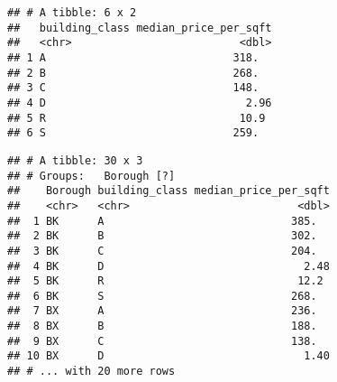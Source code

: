\documentclass[]{article}
\newenvironment{Shaded}{\begin{snugshade}}{\end{snugshade}}
\newcommand{\ControlFlowTok}[1]{\textcolor[rgb]{0.13,0.29,0.53}{\textbf{#1}}}
\newcommand{\DataTypeTok}[1]{\textcolor[rgb]{0.13,0.29,0.53}{#1}}
\newcommand{\KeywordTok}[1]{\textcolor[rgb]{0.13,0.29,0.53}{\textbf{#1}}}
\newcommand{\NormalTok}[1]{#1}
\newcommand{\OperatorTok}[1]{\textcolor[rgb]{0.81,0.36,0.00}{\textbf{#1}}}
\newcommand{\StringTok}[1]{\textcolor[rgb]{0.31,0.60,0.02}{#1}}
\begin{document}
\begin{Shaded}
\end{Shaded}

\begin{verbatim}
## # A tibble: 6 x 2
##   building_class median_price_per_sqft
##   <chr>                          <dbl>
## 1 A                             318.  
## 2 B                             268.  
## 3 C                             148.  
## 4 D                               2.96
## 5 R                              10.9 
## 6 S                             259.
\end{verbatim}

\begin{Shaded}
\end{Shaded}

\begin{verbatim}
## # A tibble: 30 x 3
## # Groups:   Borough [?]
##    Borough building_class median_price_per_sqft
##    <chr>   <chr>                          <dbl>
##  1 BK      A                             385.  
##  2 BK      B                             302.  
##  3 BK      C                             204.  
##  4 BK      D                               2.48
##  5 BK      R                              12.2 
##  6 BK      S                             268.  
##  7 BX      A                             236.  
##  8 BX      B                             188.  
##  9 BX      C                             138.  
## 10 BX      D                               1.40
## # ... with 20 more rows
\end{verbatim}

\begin{Shaded}
\end{Shaded}
\end{document}
